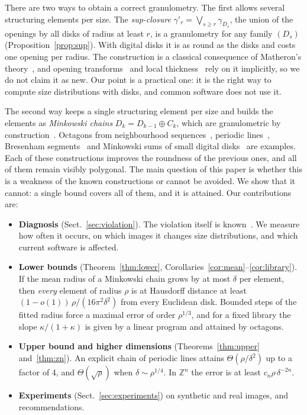 \documentclass[runningheads]{llncs}
\newcommand{\Z}{\mathbb{Z}}
\begin{document}
There are two ways to obtain a correct granulometry. The first allows several structuring elements per size. The \emph{sup-closure} $\gamma'_r=\bigvee_{s\ge r}\gamma_{D_s}$, the union of the openings by all disks of radius at least $r$, is a granulometry for any family $(D_s)$ (Proposition~\ref{prop:sup}). With digital disks it is as round as the disks and costs one opening per radius. The construction is a classical consequence of Matheron's theory~\cite{matheron1975,serra1982}, and opening transforms~\cite{vincent1994} and local thickness~\cite{hildebrand1997} rely on it implicitly, so we do not claim it as new. Our point is a practical one: it is the right way to compute size distributions with disks, and common software does not use it.

The second way keeps a single structuring element per size and builds the elements as \emph{Minkowski chains} $D_k=D_{k-1}\oplus C_k$, which are granulometric by construction~\cite{adams1993,jones1996,soille2003,vincent1994}. Octagons from neighbourhood sequences~\cite{farkas2006,rosenfeld1968}, periodic lines~\cite{jones1996}, Bresenham segments~\cite{adams1993} and Minkowski sums of small digital disks~\cite{song2019} are examples. Each of these constructions improves the roundness of the previous ones, and all of them remain visibly polygonal. The main question of this paper is whether this is a weakness of the known constructions or cannot be avoided. We show that it cannot: a single bound covers all of them, and it is attained. Our contributions are:
\begin{itemize}
\item \textbf{Diagnosis} (Sect.~\ref{sec:violation}). The violation itself is known~\cite{vogt1988}. We measure how often it occurs, on which images it changes size distributions, and which current software is affected.
\item \textbf{Lower bounds} (Theorem~\ref{thm:lower}, Corollaries~\ref{cor:mean}--\ref{cor:library}). If the mean radius of a Minkowski chain grows by at most $\delta$ per element, then \emph{every} element of radius $\rho$ is at Hausdorff distance at least $(1-o(1))\,\rho/(16\pi^2\delta^2)$ from every Euclidean disk. Bounded steps of the fitted radius force a maximal error of order $\rho^{1/3}$, and for a fixed library the slope $\kappa/(1+\kappa)$ is given by a linear program and attained by octagons.
\item \textbf{Upper bound and higher dimensions} (Theorems~\ref{thm:upper} and~\ref{thm:zn}). An explicit chain of periodic lines attains $\Theta(\rho/\delta^2)$ up to a factor of 4, and $\Theta(\sqrt\rho)$ when $\delta\sim\rho^{1/4}$. In $\Z^n$ the error is at least $c_n\rho\,\delta^{-2n}$.
\item \textbf{Experiments} (Sect.~\ref{sec:experiments}) on synthetic and real images, and recommendations.
\end{itemize}
\end{document}
